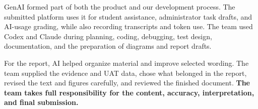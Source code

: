\documentclass[11pt,a4paper]{article}
\begin{document}
GenAI formed part of both the product and our development process. The submitted platform uses it for student assistance, administrator task drafts, and AI-usage grading, while also recording transcripts and token use. The team used Codex and Claude during planning, coding, debugging, test design, documentation, and the preparation of diagrams and report drafts.

For the report, AI helped organize material and improve selected wording. The team supplied the evidence and UAT data, chose what belonged in the report, revised the text and figures carefully, and reviewed the finished document. \textbf{The team takes full responsibility for the content, accuracy, interpretation, and final submission.}
\end{document}
